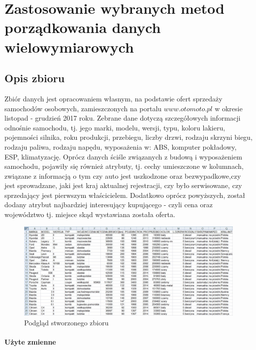 \documentclass[12pt,a4paper]{report}
\begin{document}
\chapter{Zastosowanie wybranych metod porządkowania danych wielowymiarowych}\label{Zastosowanie}



\section{Opis zbioru}

Zbiór danych jest opracowaniem własnym, na podstawie ofert sprzedaży samochodów osobowych, zamieszczonych na portalu $www.otomoto.pl$ w okresie listopad - grudzień 2017 roku. Zebrane dane dotyczą szczegółowych informacji odnośnie samochodu, tj. jego marki, modelu, wersji, typu, koloru lakieru, pojemności silnika, roku produkcji, przebiegu, liczby drzwi, rodzaju skrzyni biegu, rodzaju paliwa, rodzaju napędu, wyposażenia w: ABS, komputer pokładowy, ESP, klimatyzację. Oprócz danych ściśle związanych z budową i wyposażeniem samochodu, pojawiły się również atrybuty, tj. cechy umieszczone w kolumnach, związane z informacją o tym czy auto jest uszkodzone oraz bezwypadkowe,czy jest sprowadzane, jaki jest kraj aktualnej rejestracji, czy było serwisowane, czy sprzedający jest pierwszym właścicielem. Dodatkowo oprócz powyższych, został dodany atrybut najbardziej interesujący kupującego - czyli cena oraz województwo tj. miejsce skąd wystawiana została oferta.
\begin{figure}[h]
\centering
\includegraphics[width=1\textwidth]{img/zbior3.jpg}
\caption{Podgląd stworzonego zbioru}
\label{fig:obrazek1}
\end{figure}


\subsubsection{Użyte zmienne}
\end{document}
